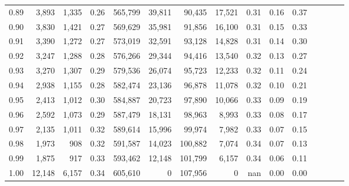 \begin{tabular}{rrrcrrrrrrrrrrr}
0.89 &   3,893 &  1,335 &                                       0.26 &  565,799 &   39,811 &   90,435 &   17,521 &  0.31 &  0.16 &                         0.37 \\
0.90 &   3,830 &  1,421 &                                       0.27 &  569,629 &   35,981 &   91,856 &   16,100 &  0.31 &  0.15 &                         0.33 \\
0.91 &   3,390 &  1,272 &                                       0.27 &  573,019 &   32,591 &   93,128 &   14,828 &  0.31 &  0.14 &                         0.30 \\
0.92 &   3,247 &  1,288 &                                       0.28 &  576,266 &   29,344 &   94,416 &   13,540 &  0.32 &  0.13 &                         0.27 \\
0.93 &   3,270 &  1,307 &                                       0.29 &  579,536 &   26,074 &   95,723 &   12,233 &  0.32 &  0.11 &                         0.24 \\
0.94 &   2,938 &  1,155 &                                       0.28 &  582,474 &   23,136 &   96,878 &   11,078 &  0.32 &  0.10 &                         0.21 \\
0.95 &   2,413 &  1,012 &                                       0.30 &  584,887 &   20,723 &   97,890 &   10,066 &  0.33 &  0.09 &                         0.19 \\
0.96 &   2,592 &  1,073 &                                       0.29 &  587,479 &   18,131 &   98,963 &    8,993 &  0.33 &  0.08 &                         0.17 \\
0.97 &   2,135 &  1,011 &                                       0.32 &  589,614 &   15,996 &   99,974 &    7,982 &  0.33 &  0.07 &                         0.15 \\
0.98 &   1,973 &    908 &                                       0.32 &  591,587 &   14,023 &  100,882 &    7,074 &  0.34 &  0.07 &                         0.13 \\
0.99 &   1,875 &    917 &                                       0.33 &  593,462 &   12,148 &  101,799 &    6,157 &  0.34 &  0.06 &                         0.11 \\
1.00 &  12,148 &  6,157 &                                       0.34 &  605,610 &        0 &  107,956 &        0 &   nan &  0.00 &                         0.00 \\
\bottomrule
\end{tabular}
